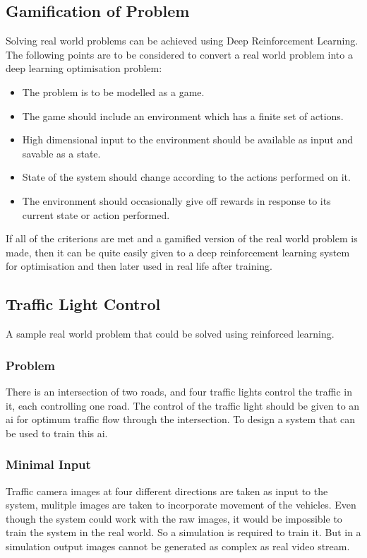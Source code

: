\documentclass[a4paper,11pt]{article}
\begin{document}
		\subsection{Gamification of Problem}
			Solving real world problems can be achieved using Deep Reinforcement Learning. The following points are to be considered to convert a real world problem into a deep learning optimisation problem:
			\begin{itemize}
				\setlength\itemsep{0em}
				\item The problem is to be modelled as a game.
				\item The game should include an environment which has a finite set of actions.
				\item High dimensional input to the environment should be available as input and savable as a state.
				\item State of the system should change according to the actions performed on it.
				\item The environment should occasionally give off rewards in response to its current state or action performed.
			\end{itemize}

			If all of the criterions are met and a gamified version of the real world problem is made, then it can be quite easily given to a deep reinforcement learning system for optimisation and then later used in real life after training.

		\subsection{Traffic Light Control}
				A sample real world problem that could be solved using reinforced learning.
			\subsubsection{Problem}
				There is an intersection of two roads, and four traffic lights control the traffic in it, each controlling one road. The control of the traffic light should be given to an \ac{ai} for optimum traffic flow through the intersection. To design a system that can be used to train this \ac{ai}. 

			\subsubsection{Minimal Input}
				Traffic camera images at four different directions are taken as input to the system, mulitple images are taken to incorporate movement of the vehicles. Even though the system could work with the raw images, it would be impossible to train the system in the real world. So a simulation is required to train it. But in a simulation output images cannot be generated as complex as real video stream. 
\end{document}
